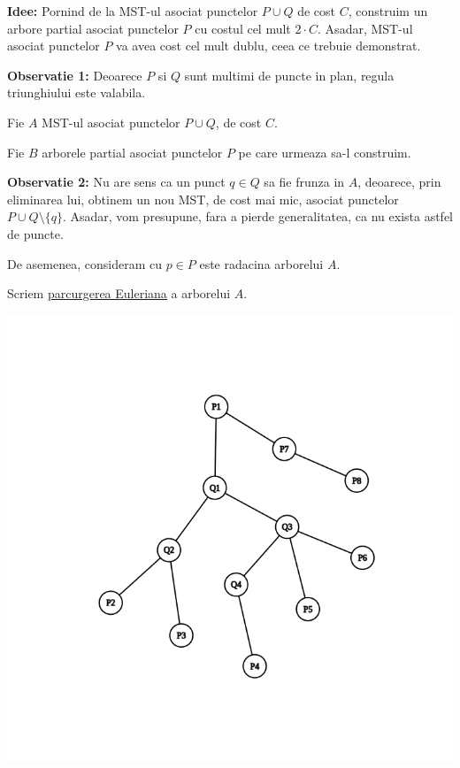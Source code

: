 \documentclass[a4paper]{article}
\begin{document}
\begin{flushleft}
\textbf{Idee:} Pornind de la MST-ul asociat punctelor $P \cup Q$ de cost $C$, construim un arbore partial asociat punctelor $P$ cu costul cel mult $2\cdot C$. Asadar, MST-ul asociat punctelor $P$ va avea cost cel mult dublu, ceea ce trebuie demonstrat.

\textbf{Observatie 1:} Deoarece $P$ si $Q$ sunt multimi de puncte in plan, regula triunghiului este valabila.

Fie $A$ MST-ul asociat punctelor $P \cup Q$, de cost $C$.

Fie $B$ arborele partial asociat punctelor $P$ pe care urmeaza sa-l construim.

\textbf{Observatie 2:} Nu are sens ca un punct $q \in Q$ sa fie frunza in $A$, deoarece, prin eliminarea lui, obtinem un nou MST, de cost mai mic, asociat punctelor $P \cup Q \setminus \{q\}$. Asadar, vom presupune, fara a pierde generalitatea, ca nu exista astfel de puncte.

De asemenea, consideram cu $p \in P$ este radacina arborelui $A$.
\vspace{16pt}

Scriem \href{https://www.infoarena.ro/lowest-common-ancestor}{\underline{parcurgerea Euleriana}} a arborelui $A$.

\includegraphics[scale=0.4]{graph.png}


\end{flushleft}
\end{document}
